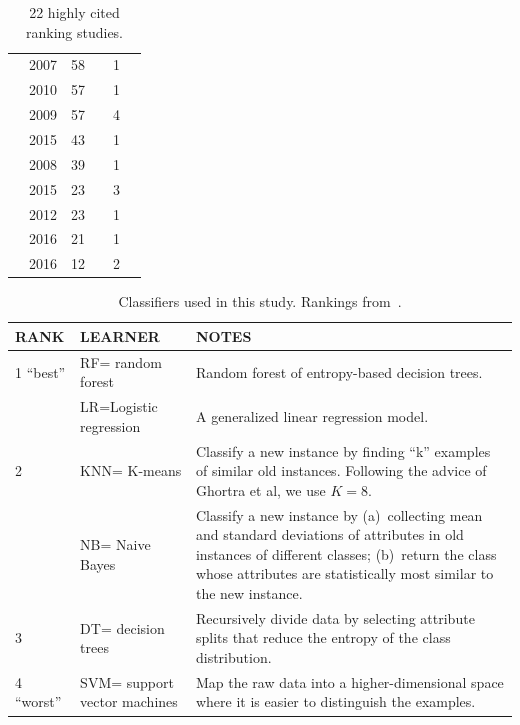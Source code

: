 \documentclass[10pt,conference]{IEEEtran}
\newcommand{\cmark}{\ding{51}}%
\newcommand{\xmark}{\ding{55}}%
\theoremstyle{break}
\theoremstyle{break}
\begin{document}
\begin{table}[!htbp]
\begin{tabular}{c@{~}|c@{~}|c@{~}|c@{~}|c@{~}|c@{~}}
        \cite{pelayo2007applying} & 2007 & 58 & \xmark & 1 & \cmark \\  
        \cite{khoshgoftaar2010attribute} & 2010 & 57 & \cmark & 1 & \cmark  \\  
        \cite{jiang2009variance} & 2009 & 57 & \cmark & 4 & \xmark  \\  
        \cite{ghotra2015revisiting} & 2015 & 43 & \cmark & 1 & \xmark  \\  
        \cite{jiang2008can} & 2008 & 39 & \cmark & 1 & \cmark  \\  
        \cite{tan2015online} & 2015 & 23 & \xmark & 3 & \cmark \\  
        \cite{pelayo2012evaluating} & 2012 & 23 & \xmark & 1 & \cmark \\  
        \cite{tantithamthavorn2016automated} & 2016 & 21 & \cmark & 1 & \xmark\\  
        \cite{fu2016tuning} & 2016 & 12 & \cmark & 2 & \xmark  \\    
\end{tabular}
\caption{22 highly cited ranking studies.}
\label{tbl:survey2}
\vspace{-0.5cm}
\end{table}

 \begin{table}[!htbp]
 \begin{tabular}{l|l|p{5in}}
{\bf RANK} & {\bf LEARNER} & {\bf NOTES}\\\hline
 1 ``best'' & RF= random forest & 
 Random forest of entropy-based decision trees.\\\cline{2-3}
 &  LR=Logistic regression &
 A generalized linear regression
model.\\\hline
 2 & KNN= K-means &  Classify a new instance by finding ``k'' examples of similar old instances.
 Following the advice of Ghortra et al, we use
 $K=8$.\\\cline{2-3}
 & NB= Naive Bayes &  Classify a new instance by (a)~collecting mean and standard deviations of attributes in old instances of  different classes; (b)~return the class whose attributes are statistically most similar to the new instance.\\\hline
 3 & DT= decision trees & Recursively
 divide data by selecting attribute splits
 that reduce the entropy of the class distribution.\\\hline

 4 ``worst'' & SVM= support vector machines &
 Map the raw data into a higher-dimensional space where it is easier to distinguish the examples.
 \\\hline
 \end{tabular}
 \caption{Classifiers used in this study.
 Rankings
 from~\cite{ghotra2015revisiting}.}\label{tbl:learners}
 \end{table}
\end{document}
